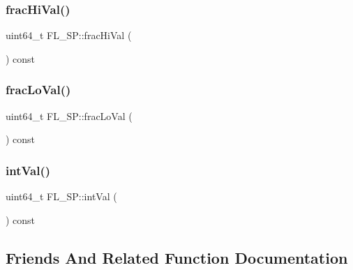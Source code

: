 \subsubsection{\texorpdfstring{frac\+Hi\+Val()}{fracHiVal()}}
{\footnotesize\ttfamily uint64\+\_\+t F\+L\+\_\+\+S\+P\+::frac\+Hi\+Val (\begin{DoxyParamCaption}{ }\end{DoxyParamCaption}) const\hspace{0.3cm}{\ttfamily [inline]}}

\mbox{\label{struct_f_l___s_p_a4121e057fe776544e13014bc15aaceea}} 
\subsubsection{\texorpdfstring{frac\+Lo\+Val()}{fracLoVal()}}
{\footnotesize\ttfamily uint64\+\_\+t F\+L\+\_\+\+S\+P\+::frac\+Lo\+Val (\begin{DoxyParamCaption}{ }\end{DoxyParamCaption}) const\hspace{0.3cm}{\ttfamily [inline]}}

\mbox{\label{struct_f_l___s_p_ac515b72596b07a75ab80173537e0358a}} 
\subsubsection{\texorpdfstring{int\+Val()}{intVal()}}
{\footnotesize\ttfamily uint64\+\_\+t F\+L\+\_\+\+S\+P\+::int\+Val (\begin{DoxyParamCaption}{ }\end{DoxyParamCaption}) const\hspace{0.3cm}{\ttfamily [inline]}}



\subsection{Friends And Related Function Documentation}
\mbox{\label{struct_f_l___s_p_a871a8c7c5ecf72cb21a348b1e86dd17b}} 
